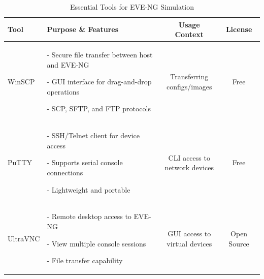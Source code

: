 \documentclass[12pt,english]{report}
\begin{document}
\begin{table}[h]
\centering
\caption{Essential Tools for EVE-NG Simulation}
\label{tab:eve-ng-tools}
\begin{tabularx}{\linewidth}{|l|>{\raggedright\arraybackslash}X|c|c|}
\hline
\textbf{Tool} & \textbf{Purpose \& Features} & \textbf{Usage Context} & \textbf{License} \\
\hline
WinSCP & 


- Secure file transfer between host and EVE-NG

- GUI interface for drag-and-drop operations

- SCP, SFTP, and FTP protocols
 & 
\makecell{Transferring\\configs/images} & 
Free \\
\hline
PuTTY & 


- SSH/Telnet client for device access

- Supports serial console connections

- Lightweight and portable
 & 
\makecell{CLI access to\\network devices} & 
Free \\
\hline
UltraVNC & 


- Remote desktop access to EVE-NG

- View multiple console sessions

- File transfer capability
 & 
\makecell{GUI access to\\virtual devices} & 
Open Source \\
\hline
\end{tabularx}
\end{table}
\end{document}
